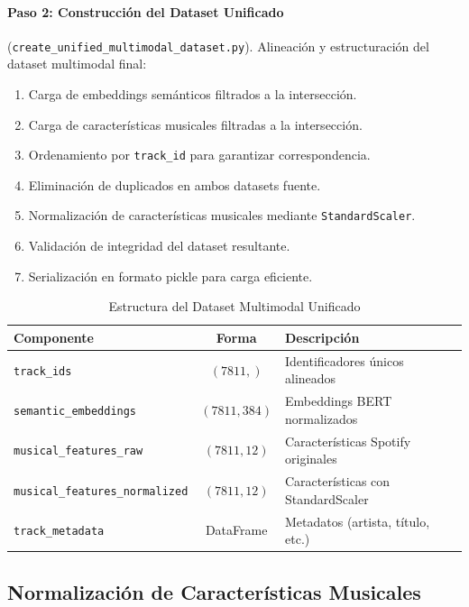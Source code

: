 \paragraph{Paso 2: Construcción del Dataset Unificado} (\texttt{create\_unified\_multimodal\_dataset.py}).
Alineación y estructuración del dataset multimodal final:

\begin{enumerate}
    \item Carga de embeddings semánticos filtrados a la intersección.
    \item Carga de características musicales filtradas a la intersección.
    \item Ordenamiento por \texttt{track\_id} para garantizar correspondencia.
    \item Eliminación de duplicados en ambos datasets fuente.
    \item Normalización de características musicales mediante \texttt{StandardScaler}.
    \item Validación de integridad del dataset resultante.
    \item Serialización en formato pickle para carga eficiente.
\end{enumerate}

\begin{table}[htbp]
\centering
\caption{Estructura del Dataset Multimodal Unificado}
\label{tab:dataset-unificado}
\begin{tabular}{lcl}
\toprule
\textbf{Componente} & \textbf{Forma} & \textbf{Descripción} \\
\midrule
\texttt{track\_ids} & $(7811,)$ & Identificadores únicos alineados \\
\texttt{semantic\_embeddings} & $(7811, 384)$ & Embeddings BERT normalizados \\
\texttt{musical\_features\_raw} & $(7811, 12)$ & Características Spotify originales \\
\texttt{musical\_features\_normalized} & $(7811, 12)$ & Características con StandardScaler \\
\texttt{track\_metadata} & DataFrame & Metadatos (artista, título, etc.) \\
\bottomrule
\end{tabular}
\end{table}

\subsection{Normalización de Características Musicales}
\label{subsec:normalizacion-musicales}


